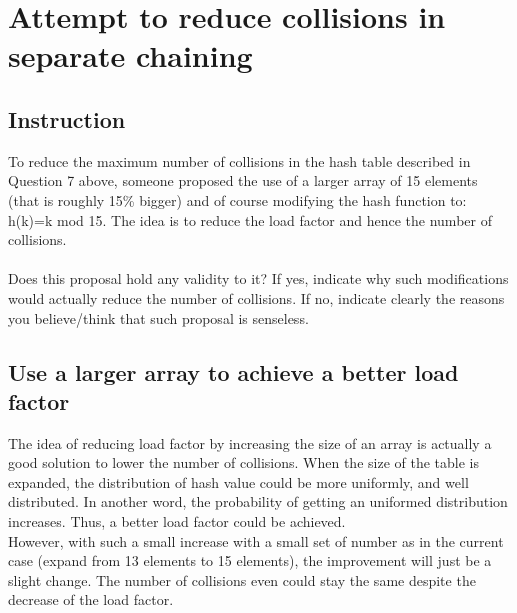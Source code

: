 \section{Attempt to reduce collisions in separate chaining}
\subsection{Instruction}
To reduce the maximum number of collisions in the hash table described in Question 7 above,
someone proposed the use of a larger array of 15 elements (that is roughly 15\% bigger) and of
course modifying the hash function to: h(k)=k mod 15. The idea is to reduce the load factor and
hence the number of collisions.
\\
\\
Does this proposal hold any validity to it? If yes, indicate why such modifications would actually
reduce the number of collisions. If no, indicate clearly the reasons you believe/think that such
proposal is senseless. 

\subsection{Use a larger array to achieve a better load factor}
The idea of reducing load factor by increasing the size of an array is actually a good solution to lower the number of collisions. When the size of the table is expanded, the distribution of hash value could be more uniformly, and well distributed. In another word, the probability of getting an uniformed distribution increases. Thus, a better load factor could be achieved. 
\\
However, with such a small increase with a small set of number as in the current case (expand from 13 elements to 15 elements), the improvement will just be a slight change. The number of collisions even could stay the same despite the decrease of the load factor. 